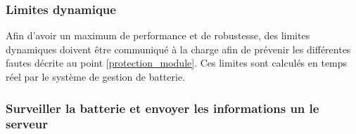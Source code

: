 	\subsubsection{Limites dynamique}
	Afin d'avoir un maximum de performance et de robustesse, des limites dynamiques doivent être communiqué à la charge afin de prévenir les différentes fautes décrite au point \ref{protection_module}. Ces limites sont calculés en temps réel par le système de gestion de batterie. 
	
	\subsubsection{Surveiller la batterie et envoyer les informations un le serveur}
	